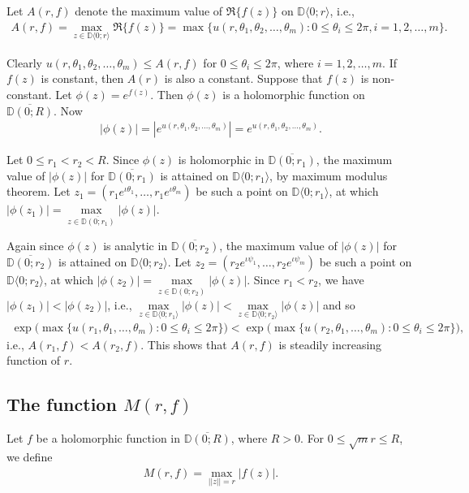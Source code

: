 \documentclass[11pt, reqno]{amsart}
\newcommand{\ol}{\overline}
\numberwithin{equation}{section}
\begin{document}
Let $A(r,f)$ denote the maximum value of $\Re\{f(z)\}$ on $\mathbb{D}\langle 0;r\rangle$, i.e.,
\begin{align*}
 A(r,f)=\max\limits_{z\in \mathbb{D}\langle 0;r\rangle} \Re\{f(z)\}=\max\{u(r,\theta_1,\theta_2,\ldots,\theta_m): 0\leq \theta_i\leq 2\pi, i=1,2,\ldots,m\}.
\end{align*}

Clearly $u(r,\theta_1,\theta_2,\ldots,\theta_m)\leq A(r,f)$ for $0\leq \theta_i\leq 2\pi$, where $i=1,2,\ldots,m$. If $f(z)$ is constant, then $A(r)$ is also a constant. Suppose that $f(z)$ is non-constant.
Let $\phi(z)=e^{f(z)}$. Then $\phi(z)$ is a holomorphic function on $\ol{\mathbb{D}(0;R)}$. Now
\begin{align*}
|\phi(z)|=\left|e^{u(r,\theta_1,\theta_2,\ldots,\theta_m)}\right|=e^{u(r,\theta_1,\theta_2,\ldots,\theta_m)}.
\end{align*}

Let $0\leq r_{1}<r_{2}<R$. Since $\phi(z)$ is holomorphic in $\ol{\mathbb{D}(0;r_1)}$, the maximum value of $|\phi(z)|$ for $\ol{\mathbb{D}(0;r_1)}$ is attained on $\mathbb{D}\langle 0;r_1\rangle$, by maximum modulus theorem. Let $z_{1}=\left(r_1e^{\iota \theta_1},\ldots, r_1e^{\iota \theta_m}\right)$ be such a point on $\mathbb{D}\langle 0;r_1\rangle$, at which $|\phi(z_{1})|=\max\limits_{z\in \ol{\mathbb{D}(0;r_1)}}|\phi(z)|$.

Again since $\phi(z)$ is analytic in $\ol{\mathbb{D}(0;r_2)}$, the maximum value of $|\phi(z)|$ for $\ol{\mathbb{D}(0;r_2)}$ is attained on $\mathbb{D}\langle 0;r_2\rangle$. Let $z_{2}=\left(r_2e^{\iota \psi_1},\ldots, r_2e^{\iota \psi_m}\right)$ be such a point on $\mathbb{D}\langle 0;r_2\rangle$, at which $|\phi(z_{2})|=\max\limits_{z\in \ol{\mathbb{D}(0;r_2)}}|\phi(z)|$.
Since $r_{1}<r_{2}$, we have $|\phi(z_{1})|<|\phi(z_{2})|$, i.e., $\max\limits_{z\in \mathbb{D}\langle 0;r_1\rangle}|\phi(z)|<\max\limits_{z\in \mathbb{D}\langle 0;r_2\rangle}|\phi(z)|$ and so
\begin{align*} \exp \Big(\max\{u(r_1,\theta_1,\ldots,\theta_m): 0\leq \theta_i\leq 2\pi\}\Big)<\exp \Big(\max\{u(r_2,\theta_1,\ldots,\theta_m): 0\leq \theta_i\leq 2\pi\}\Big),
\end{align*}
i.e., $A(r_{1},f)<A(r_{2},f)$. This shows that $A(r,f)$ is steadily increasing function of $r$.

\subsection{\bf{The function $M(r,f)$}}
Let $f$ be a holomorphic function in $\ol{\mathbb{D}(0;R)}$, where $R>0$. For $0\leq \sqrt{m}r\leq R$, we define 
\begin{align*}
M(r,f)=\max\limits_{||z||=r}|f(z)|.
\end{align*}
\end{document}
